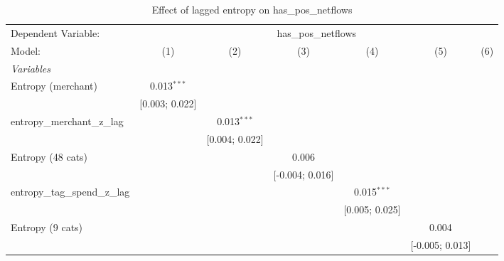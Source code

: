 
\begin{table}[htbp]
   \centering
   \tiny
   \begin{threeparttable}[b]
      \caption{\label{tab:reg_has_pos_netflows_lagged_z} Effect of lagged entropy on has\_pos\_netflows}
      \begin{tabular}{lcccccc}
         \tabularnewline \midrule \midrule
         Dependent Variable: & \multicolumn{6}{c}{has\_pos\_netflows}\\
         Model:                          & (1)              & (2)              & (3)              & (4)              & (5)              & (6)\\  
         \midrule
         \emph{Variables}\\
         Entropy (merchant)              & 0.013$^{***}$    &                  &                  &                  &                  &   \\   
                                         & [0.003; 0.022]   &                  &                  &                  &                  &   \\   
         entropy\_merchant\_z\_lag       &                  & 0.013$^{***}$    &                  &                  &                  &   \\   
                                         &                  & [0.004; 0.022]   &                  &                  &                  &   \\   
         Entropy (48 cats)               &                  &                  & 0.006            &                  &                  &   \\   
                                         &                  &                  & [-0.004; 0.016]  &                  &                  &   \\   
         entropy\_tag\_spend\_z\_lag     &                  &                  &                  & 0.015$^{***}$    &                  &   \\   
                                         &                  &                  &                  & [0.005; 0.025]   &                  &   \\   
         Entropy (9 cats)                &                  &                  &                  &                  & 0.004            &   \\   
                                         &                  &                  &                  &                  & [-0.005; 0.013]  &   \\   

\end{tabular}
\end{threeparttable}
\end{table}
